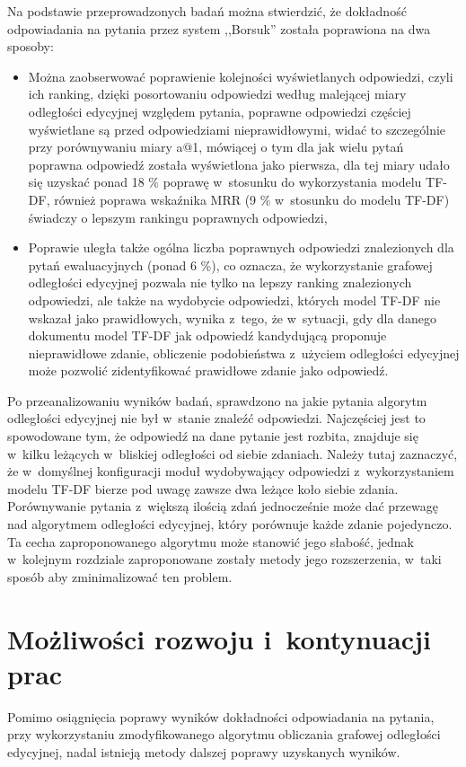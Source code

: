 \documentclass[a4paper, twoside, openright, 12pt]{report}
\begin{document}
    Na podstawie przeprowadzonych badań można stwierdzić, że dokładność odpowiadania na pytania przez system ,,Borsuk''
    została poprawiona na dwa sposoby:
    \begin{itemize}
        \item Można zaobserwować poprawienie kolejności wyświetlanych odpowiedzi, czyli ich ranking, dzięki posortowaniu
            odpowiedzi według malejącej miary odległości edycyjnej względem pytania, poprawne odpowiedzi częściej
            wyświetlane są przed odpowiedziami nieprawidłowymi, widać to szczególnie przy porównywaniu miary a@1,
            mówiącej o tym dla jak wielu pytań poprawna odpowiedź została wyświetlona jako pierwsza, dla tej miary
            udało się uzyskać ponad 18 \% poprawę w~stosunku do wykorzystania modelu TF-DF, również poprawa wskaźnika
            MRR (9 \% w~stosunku do modelu TF-DF) świadczy o lepszym rankingu poprawnych odpowiedzi,
        \item Poprawie uległa także ogólna liczba poprawnych odpowiedzi znalezionych dla pytań ewaluacyjnych (ponad 6 \%),
            co oznacza, że wykorzystanie grafowej odległości edycyjnej pozwala nie tylko na lepszy ranking znalezionych
            odpowiedzi, ale także na wydobycie odpowiedzi, których model TF-DF nie wskazał jako prawidłowych,
            wynika z~tego, że w~sytuacji, gdy dla danego dokumentu model TF-DF jak odpowiedź kandydującą proponuje
            nieprawidłowe zdanie, obliczenie podobieństwa z~użyciem odległości edycyjnej może pozwolić zidentyfikować
            prawidłowe zdanie jako odpowiedź.
    \end{itemize}

    Po przeanalizowaniu wyników badań, sprawdzono na jakie pytania algorytm odległości edycyjnej nie był w~stanie znaleźć
    odpowiedzi. Najczęściej jest to spowodowane tym, że odpowiedź na dane pytanie jest rozbita, znajduje się w~kilku
    leżących w~bliskiej odległości od siebie zdaniach. Należy tutaj zaznaczyć, że w~domyślnej konfiguracji moduł wydobywający
    odpowiedzi z~wykorzystaniem modelu TF-DF bierze pod uwagę zawsze dwa leżące koło siebie zdania. Porównywanie pytania
    z~większą ilością zdań jednocześnie może dać przewagę nad algorytmem odległości edycyjnej, który porównuje każde
    zdanie pojedynczo. Ta cecha zaproponowanego algorytmu może stanowić jego słabość, jednak w~kolejnym rozdziale
    zaproponowane zostały metody jego rozszerzenia, w~taki sposób aby zminimalizować ten problem.

\chapter{Możliwości rozwoju i~kontynuacji prac}
    Pomimo osiągnięcia poprawy wyników dokładności odpowiadania na pytania, przy wykorzystaniu zmodyfikowanego algorytmu
    obliczania grafowej odległości edycyjnej, nadal istnieją metody dalszej poprawy uzyskanych wyników.
\end{document}
